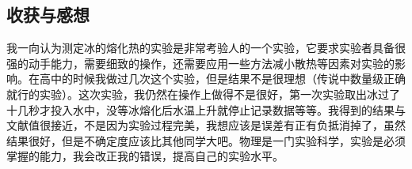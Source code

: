 \documentclass[a4paper,11pt]{article}
\begin{document}
\begin{CJK*}{UTF8}{gbsn}
\section{收获与感想}
我一向认为测定冰的熔化热的实验是非常考验人的一个实验，它要求实验者具备很强的动手能力，需要细致的操作，还需要应用一些方法减小散热等因素对实验的影响。在高中的时候我做过几次这个实验，但是结果不是很理想（传说中数量级正确就行的实验）。这次实验，我仍然在操作上做得不是很好，第一次实验取出冰过了十几秒才投入水中，没等冰熔化后水温上升就停止记录数据等等。我得到的结果与文献值很接近，不是因为实验过程完美，我想应该是误差有正有负抵消掉了，虽然结果很好，但是不确定度应该比其他同学大吧。物理是一门实验科学，实验是必须掌握的能力，我会改正我的错误，提高自己的实验水平。

\end{CJK*}
\end{document}
